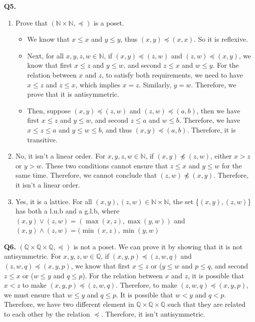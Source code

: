 \documentclass{article}[12pt]
\begin{document}
\noindent \textbf{Q5.}
\begin{enumerate}
\item Prove that $(\mathbb{N} \times \mathbb{N}, \preceq)$ is a poset.
\begin{itemize}
\item We know that $x\leq x$ and $y\leq y$, thus $(x, y) \preceq (x, x)$. So it is reflexive.
\item Next, for all $x,y,z,w\in \mathbb{N}$, if $(x, y) \preceq(z, w)$ and $(z, w) \preceq(x, y)$, we know that first $x\leq z$ and $y \leq w$, and second $z\leq x$ and $w \leq y$. For the relation between $x$ and $z$, to satisfy both requirements, we need to have $x\leq z$ and $z\leq x$, which implies $x=z$. Similarly, $y=w$. Therefore, we prove that it is antisymmetric.
\item Then, suppose $(x, y) \preceq(z, w)$ and $(z, w) \preceq(a, b)$, then we have first $x\leq z$ and $y \leq w$, and second $z\leq a$ and $w \leq b$. Therefore, we have $x\leq z\leq a$ and $y\leq w\leq b$, and thus $(x, y) \preceq(a, b)$. Therefore, it is transitive.
\end{itemize}  
\item No, it isn't a linear order. For $x,y,z,w\in \mathbb{N}$, if $(x, y) \not\preceq(z, w)$, either $x>z$ or $y>w$. These two conditions cannot ensure that $z\leq x$ and $y\leq w$ for the same time. Therefore, we cannot conclude that $(z, w) \not\preceq(x, y)$. Therefore, it isn't a linear order.
\item Yes, it is a lattice. For all $(x,y),(z,w)\in \mathbb{N}\times \mathbb{N}$, the set \{$(x,y),(z,w)$\} has both a l.u.b and a g.l.b, where $(x,y)\vee(z,w)=(\max(x,z),\max(y,w))$ and $(x,y)\wedge(z,w)=(\min(x,z),\min(y,w)$
\end{enumerate}

\noindent \textbf{Q6.}
$(\mathbb{Q}\times \mathbb{Q} \times \mathbb{Q},  \preceq)$ is not a poset. We can prove it by showing that it is not antisymmetric.
For $x,y,z,w\in \mathbb{Q}$, if $(x, y,p) \preceq(z, w,q)$ and $(z, w,q) \preceq(x, y,p)$, we know that first $x\leq z$ or ($y \leq w$ and $p\leq q$, and second $z\leq x$ or ($w \leq y$ and $q\leq p$). For the relation between $x$ and $z$, it is possible that $x<z$ to make $(x, y,p) \preceq(z, w,q)$. Therefore, to make $(z, w,q) \preceq(x, y,p)$, we must ensure that $w \leq y$ and $q\leq p$. It is possible that $w<y$ and $q<p$. Therefore, we have two different element in $\mathbb{Q}\times \mathbb{Q} \times \mathbb{Q}$ such that they are related to each other by the relation $\preceq$. Therefore, it isn't antisymmetric.
\\
\end{document}
